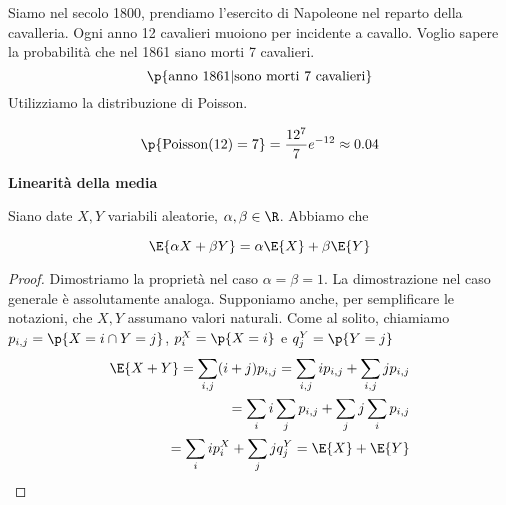 \begin{exmp}
	Siamo nel secolo 1800, prendiamo l'esercito di Napoleone nel reparto della
	cavalleria. Ogni anno 12 cavalieri muoiono per incidente a cavallo. Voglio
	sapere la probabilit\`a  che nel 1861 siano morti 7 cavalieri.
    \begin{equation*}
    \p{\text{anno } 1861 | \text{sono morti 7 cavalieri}}
    \end{equation*}
    Utilizziamo la distribuzione di Poisson.
    
    \begin{equation*}
    \p{\text{Poisson}(12) = 7} = \dfrac{12^7}{7}e^{-12} \approx 0.04
    \end{equation*}
    
\end{exmp}

\begin{prop}
	\textbf{Linearit\`a  della media}
    
    Siano date $ X,Y $ variabili aleatorie, $ \alpha ,\beta \in \R $. Abbiamo
    che
    
    \begin{equation*}
    \E{\alpha X + \beta Y} = \alpha \E{X} + \beta \E{Y}
    \end{equation*}
\end{prop}


\begin{proof} Dimostriamo la propriet\`a nel caso $\alpha=\beta=1$. La
    dimostrazione nel caso generale \`e assolutamente analoga. Supponiamo anche,
    per semplificare le notazioni, che $X,Y$ assumano valori naturali. Come al
    solito, chiamiamo $p_{i,j}=\p{X=i\cap Y=j}$, $p_i^X=\p{X=i}$ e
    $q_j^Y=\p{Y=j}$
            \begin{equation*}
            \begin{aligned}
            \E{X+Y} = \sum_{i,j} (i+j)p_{i,j} = \sum_{i,j} ip_{i,j} + \sum_{i,j} jp_{i,j} \\
            = \sum_i i \sum_j p_{i,j} + \sum_j j \sum_i p_{i,j} \\
            = \sum_i i p_i^X + \sum_j jq_j^Y = \E{X} + \E{Y}
            \end{aligned}
            \end{equation*}
\end{proof}

